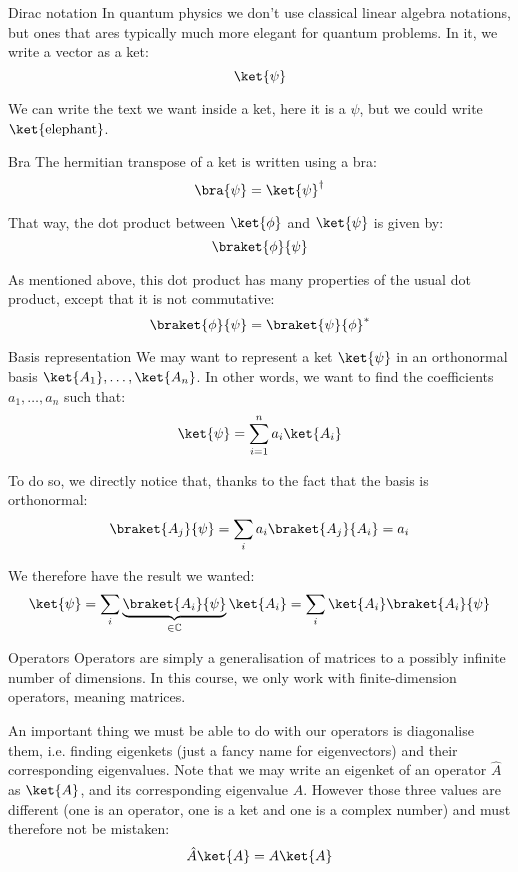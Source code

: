 \documentclass[a4paper]{article}
\begin{document}
\begin{parag}{Dirac notation}
    In quantum physics we don't use classical linear algebra notations, but ones that ares typically much more elegant for quantum problems. In it, we write a vector as a ket: 
    \[\ket{\psi}\]
    
    We can write the text we want inside a ket, here it is a $\psi$, but we could write $\ket{\text{elephant}}$. 

    \begin{subparag}{Bra}
        The hermitian transpose of a ket is written using a bra: 
        \[\bra{\psi} = \ket{\psi}^{\dagger}\]
        
        That way, the dot product between $\ket{\phi}$ and $\ket{\psi}$ is given by: 
        \[\braket{\phi}{\psi}\]

        As mentioned above, this dot product has many properties of the usual dot product, except that it is not commutative: 
        \[\braket{\phi}{\psi} = \braket{\psi}{\phi}^*\]
    \end{subparag}

    \begin{subparag}{Basis representation}
        We may want to represent a ket $\ket{\psi}$ in an orthonormal basis $\ket{A_1}, \ldots, \ket{A_n}$. In other words, we want to find the coefficients $a_1, \ldots, a_n$ such that: 
        \[\ket{\psi} = \sum_{i=1}^n a_i \ket{A_i}\]
        
        To do so, we directly notice that, thanks to the fact that the basis is orthonormal: 
        \[\braket{A_j}{\psi} = \sum_{i} a_i \braket{A_j}{A_i} = a_i\]
        
        We therefore have the result we wanted:
        \[\ket{\psi} = \sum_{i} \underbrace{\braket{A_i}{\psi}}_{\in \mathbb{C}} \ket{A_i} = \sum_{i} \ket{A_i} \braket{A_i}{\psi}\]
    \end{subparag}
    
    \begin{subparag}{Operators}
        Operators are simply a generalisation of matrices to a possibly infinite number of dimensions. In this course, we only work with finite-dimension operators, meaning matrices.

        An important thing we must be able to do with our operators is diagonalise them, i.e. finding eigenkets (just a fancy name for eigenvectors) and their corresponding eigenvalues. Note that we may write an eigenket of an operator $\hat{A}$ as $\ket{A}$, and its corresponding eigenvalue $A$. However those three values are different (one is an operator, one is a ket and one is a complex number) and must therefore not be mistaken: 
        \[\hat{A}\ket{A} = A \ket{A}\]
    \end{subparag}


\end{parag}
\end{document}

